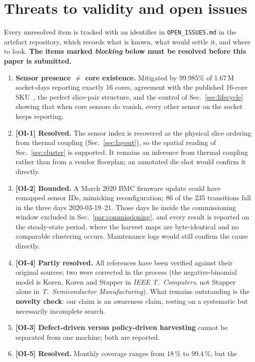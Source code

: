 \documentclass[10pt,conference]{IEEEtran}
\begin{document}
\section{Threats to validity and open issues}
\label{sec:threats}
Every unresolved item is tracked with an identifier in \texttt{OPEN\_ISSUES.md} in the artefact
repository, which records what is known, what would settle it, and where to look. \textbf{The items
marked \emph{blocking} below must be resolved before this paper is submitted.}

\begin{enumerate}
\item \textbf{Sensor presence $\ne$ core existence.} Mitigated by 99.985\% of 1.67\,M socket-days
reporting exactly 16 cores, agreement with the published 16-core SKU~\cite{ibm_ac922}, the perfect
slice-pair structure, and the control of Sec.~\ref{sec:lifecycle} showing that when core sensors do
vanish, every other sensor on the socket keeps reporting.
\item \textbf{[OI-1] Resolved.} The sensor index is recovered as the physical slice ordering from
thermal coupling (Sec.~\ref{sec:layout}), so the spatial reading of Sec.~\ref{sec:cluster} is
supported. It remains an inference from thermal coupling rather than from a vendor floorplan; an
annotated die shot would confirm it directly.
\item \textbf{[OI-2] Bounded.} A March 2020 BMC firmware update could have remapped sensor IDs,
mimicking reconfiguration; 86 of the 235 transitions fall in the three days 2020-03-19--21. Those
days lie inside the commissioning window excluded in Sec.~\ref{par:commissioning}, and every
result is reported on the steady-state period, where the harvest maps are byte-identical and no
comparable clustering occurs. Maintenance logs would still confirm the cause directly.
\item \textbf{[OI-4] Partly resolved.} All references have been verified against their original
sources; two were corrected in the process (the negative-binomial model is Koren, Koren and
Stapper in \emph{IEEE T.\ Computers}, not Stapper alone in \emph{T.\ Semiconductor
Manufacturing}). What remains outstanding is the \textbf{novelty check}: our claim is an
awareness claim, resting on a systematic but necessarily incomplete search.
\item \textbf{[OI-3] Defect-driven versus policy-driven harvesting} cannot be separated from one
machine; both are reported.
\item \textbf{[OI-5] Resolved.} Monthly coverage ranges from 18\,\% to 99.4\,\%, but the

\end{enumerate}
\end{document}
